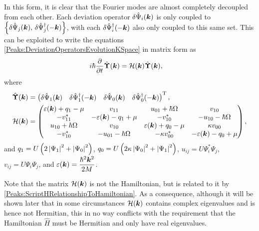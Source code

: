 In this form, it is clear that the Fourier modes are almost completely decoupled from each other. Each deviation operator $\delta\hat{\Psi}_i(\bm{k})$ is only coupled to $\left\{\delta\hat{\Psi}_j(\bm{k}),\, \delta\hat{\Psi}_j^\dagger(-\bm{k})\right\}$, with each $\delta\hat{\Psi}_i^\dagger(-\bm{k})$ also only coupled to this same set. This can be exploited to write the equations \eqref{Peaks:DeviationOperatorsEvolutionKSpace} in matrix form as
\begin{align}
    \label{Peaks:DeviationOperatorsMatrixEvolution}
    i \hbar \frac{\partial }{\partial t}\hat{\vect{\Upsilon}}(\vect{k}) &= \mathcal{H}(\vect{k}) \hat{\vect{\Upsilon}}(\vect{k}),
\end{align}
where
\begin{align}
    \hat{\vect{\Upsilon}}(\vect{k}) &= 
    \begin{pmatrix}
        \delta\hat{\Psi}_1(\vect{k}) &
        \delta\hat{\Psi}_1^\dagger(-\vect{k}) &
        \delta\hat{\Psi}_0(\vect{k}) &
        \delta\hat{\Psi}_0^\dagger(-\vect{k})
    \end{pmatrix}^\text{T},\\
    \mathcal{H}(\vect{k}) &= 
    \begin{pmatrix}
        \varepsilon(\vect{k}) + q_{1} - \mu & v_{11} & u_{01} + \hbar \Omega & v_{10}\\
        -v_{11}^* & -\varepsilon(\vect{k}) - q_1 + \mu & -v_{10}^* & -u_{10} - \hbar \Omega\\
        u_{10} + \hbar \Omega & v_{10} & \varepsilon(\vect{k}) + q_0 - \mu & \kappa v_{00}\\
        -v_{10}^* & -u_{01} - \hbar \Omega & -\kappa v_{00}^* & -\varepsilon(\vect{k}) - q_0 + \mu
    \end{pmatrix},\label{Peaks:HMatrix}
\end{align}
and $q_1 = U\left(2\left|\Psi_1\right|^2+\left|\Psi_0\right|^2\right)$, $q_0 = U\left(2\kappa \left|\Psi_0\right|^2 + \left|\Psi_1\right|^2\right)$, $u_{ij} = U\Psi_i^*\Psi_j$, $v_{ij} = U\Psi_i\Psi_j$, and $\displaystyle \protect{\varepsilon(\ensuremath{\bm{k}}) = \frac{\hbar^2 \ensuremath{\bm{k}}^2}{2M}}$.

Note that the matrix $\mathcal{H}(\bm{k})$ is not the Hamiltonian, but is related to it by \eqref{Peaks:ScriptHRelationshipToHamiltonian}. As a consequence, although it will be shown later that in some circumstances $\mathcal{H}(\bm{k})$ contains complex eigenvalues and is hence not Hermitian, this in no way conflicts with the requirement that the Hamiltonian $\hat{H}$ must be Hermitian and only have real eigenvalues.

